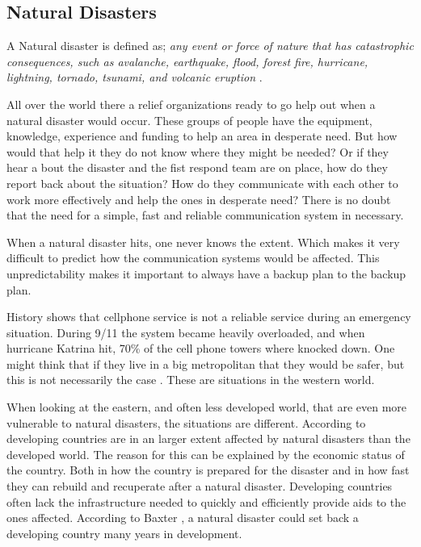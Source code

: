 \subsection{Natural Disasters}
A Natural disaster is defined as; \textit{any event or force of nature that has catastrophic consequences, such as avalanche, earthquake, flood, forest fire, hurricane, lightning, tornado, tsunami, and volcanic eruption} \cite{naturalDisaster}.

All over the world there a relief organizations ready to go help out when a natural disaster would occur. These groups of people have the equipment, knowledge, experience and funding to help an area in desperate need. But how would that help it they do not know where they might be needed? Or if they hear a bout the disaster and the fist respond team are on place, how do they report back about the situation? How do they communicate with each other to work more effectively and help the ones in desperate need? There is no doubt that the need for a simple, fast and reliable communication system in necessary. 

When a natural disaster hits, one never knows the extent. Which makes it very difficult to predict how the communication systems would be affected. This unpredictability makes it important to always have a backup plan to the backup plan. 

History shows that cellphone service is not a reliable service during an emergency situation. During 9/11 the system became heavily overloaded, and when hurricane Katrina hit, 70\% of the cell phone towers where knocked down. One might think that if they live in a big metropolitan that they would be safer, but this is not necessarily the case \cite{disasterComm}. These are situations in the western world. 

When looking at the eastern, and often less developed world, that are even more vulnerable to natural disasters, the situations are different. According to \cite{DevelopingWorld, 360} developing countries are in an larger extent affected by natural disasters than the developed world. The reason for this can be explained by the economic status of the country. Both in how the country is prepared for the disaster and in how fast they can rebuild and recuperate after a natural disaster. Developing countries often lack the infrastructure needed to quickly and efficiently provide aids to the ones affected. According to Baxter \cite{360} , a natural disaster could set back a developing country many years in development.  

